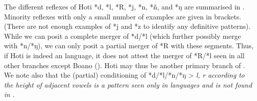 
The different reflexes of Hoti *d,
*l, *R, *j, *n, *ñ,
and *ŋ are summarised in .
Minority reflexes with only a small number of examples are given in brackets.
(There are not enough examples of *j
and *z to identify any definitive patterns).
While we can posit a complete merger of *d/*l (which further
possibly merge with *n/*ŋ),
we can only posit a partial merger of *R with these segments.
Thus, if Hoti is indeed an  language,
it does not attest the merger of *R/*l seen in all other branches except Boano ().
Hoti may thus be another primary branch of .
We note also that the (partial) conditioning of *d/*l/*n/*ŋ >
\it{l, r} according to the height of adjacent vowels is a pattern seen
only in  languages
and is not found in .

